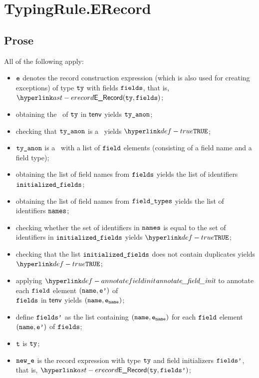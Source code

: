 
\section{TypingRule.ERecord \label{sec:TypingRule.ERecord}}

\subsection{Prose}
All of the following apply:
\begin{itemize}
  \item $\texttt{e}$ denotes the record construction expression (which is also used for creating exceptions) of type $\texttt{ty}$ with fields $\texttt{fields}$,
        that is, $\ERecord(\tty, \vfields)$;
  \item obtaining the \underlyingtype\ of $\texttt{ty}$ in $\textsf{tenv}$ yields $\texttt{ty\_anon}$\ProseOrTypeError;
  \item checking that $\texttt{ty\_anon}$ is a \structuredtype\ yields $\True$\ProseOrTypeError;%
  \item $\texttt{ty\_anon}$ is a \structuredtype\ with a list of $\texttt{field}$ elements (consisting of a field name and a field type);
  \item obtaining the list of field names from $\texttt{fields}$ yields the list of identifiers \\
        $\texttt{initialized\_fields}$;
  \item obtaining the list of field names from $\texttt{field\_types}$ yields the list of identifiers $\texttt{names}$;
  \item checking whether the set of identifiers in $\texttt{names}$ is equal to the set of identifiers in $\texttt{initialized\_fields}$
        yields $\True$\ProseOrTypeError;
  \item checking that the list $\texttt{initialized\_fields}$ does not contain duplicates yields \\
        $\True$\ProseOrTypeError;
  \item applying $\annotatefieldinit$ to annotate each $\texttt{field}$ element $(\texttt{name},\texttt{e'})$ of \\
        $\texttt{fields}$ in $\textsf{tenv}$ yields $(\texttt{name},\texttt{e}_{\texttt{name}})$\ProseOrTypeError;
  \item define $\texttt{fields'}$ as the list containing $(\texttt{name},\texttt{e}_{\texttt{name}})$ for each $\texttt{field}$ element $(\texttt{name},\texttt{e'})$ of $\texttt{fields}$;
  \item $\texttt{t}$ is $\texttt{ty}$;
  \item $\texttt{new\_e}$ is the record expression with type $\texttt{ty}$ and field initializers $\texttt{fields'}$, that is, $\ERecord(\tty, \fieldsp)$;
\end{itemize}

